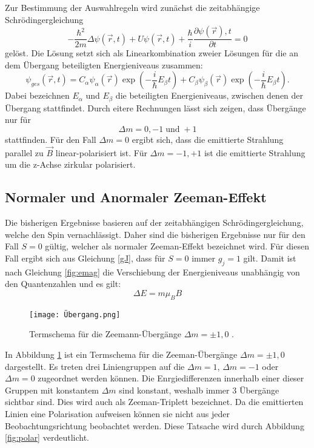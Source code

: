 Zur Bestimmung der Auswahlregeln wird zunächst die zeitabhängige
Schrödingergleichung
\begin{equation}
  -\frac{\hbar^2}{2m}\Delta\psi(\vec{r},t)+U\psi(\vec{r},t)+\frac{\hbar}{i}\frac{\partial\psi(\vec{r}),t}{\partial t}=0
\end{equation}
gelöst. Die Lösung setzt sich als Linearkombination zweier Lösungen für
die an dem Übergang beteiligten Energieniveaus zusammen:
\begin{equation}
  \psi_{ges}(\vec{r},t)=C_{\alpha}\psi_{\alpha}(\vec{r})\exp(-\frac{i}{\hbar}E_{\beta}t)+
  C_{\beta}\psi_{\beta}(\vec{r})\exp(-\frac{i}{\hbar}E_{\beta}t).
\end{equation}
Dabei bezeichnen $E_{\alpha}$ und $E_{\beta}$ die beteiligten Energieniveaus, zwischen denen
der Übergang stattfindet. Durch eitere Rechnungen lässt sich zeigen, dass Übergänge
nur für
\begin{equation}
  \Delta m= 0,-1 \;\text{und}\;+1
\end{equation}
stattfinden. Für den Fall $\Delta m=0$ ergibt sich, dass die emittierte
Strahlung  parallel zu $\vec{B}$ linear-polarisiert ist. Für $\Delta m= -1, +1$
ist die emittierte Strahlung um die z-Achse zirkular polarisiert.

\subsection{Normaler und Anormaler Zeeman-Effekt}
Die bisherigen Ergebnisse basieren auf der zeitabhängigen Schrödingergleichung,
welche den Spin vernachlässigt. Daher sind die bisherigen Ergebnisse nur für den
Fall $S=0$ gültig, welcher als normaler Zeeman-Effekt bezeichnet wird.
Für diesen Fall ergibt sich aus Gleichung \ref{gJ}, dass für $S=0$ immer
$g_j=1$ gilt. Damit ist nach Gleichung \ref{fig:emag} die Verschiebung der
Energieniveaus unabhängig von den Quantenzahlen und es gilt:
\begin{equation}
  \Delta E =m \mu_B B
\end{equation}

\begin{figure}
  \centering
  \texttt{[image: Übergang.png]}
  \caption{Termschema für die Zeemann-Übergänge $\Delta m=\pm1, 0$ \cite{demtröder}. }
  \label{fig:Übergang}
\end{figure}


In Abbildung \ref{fig:Übergang} ist ein Termschema für die Zeeman-Übergänge
$\Delta m=\pm1, 0$ dargestellt. Es treten drei Liniengruppen auf die $\Delta m=1$,
$\Delta m=-1$ oder $\Delta m=0$ zugeordnet werden können. Die Enrgiedifferenzen
innerhalb einer dieser Gruppen mit konstantem $\Delta m $ sind konstant, weshalb
immer 3 Übergänge sichtbar sind. Dies wird auch als Zeeman-Triplett bezeichnet.
Da die emittierten Linien eine Polarisation aufweisen können sie nicht
aus jeder Beobachtungsrichtung beobachtet werden. Diese Tatsache wird durch Abbildung
\ref{fig:polar} verdeutlicht.

